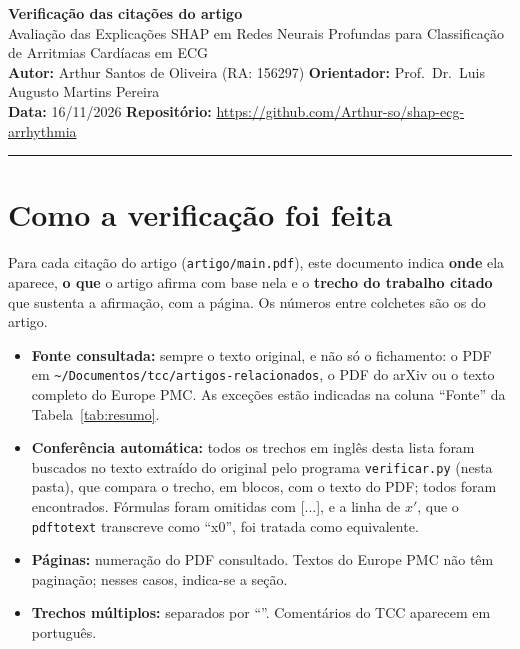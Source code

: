 \documentclass[11pt,a4paper]{article}
\begin{document}
\begin{center}
    {\LARGE \textbf{Verificação das citações do artigo}} \\[0.35em]
    {\large Avaliação das Explicações SHAP em Redes Neurais Profundas para Classificação de Arritmias Cardíacas em ECG} \\[0.3em]
    \textbf{Autor:} Arthur Santos de Oliveira (RA: 156297) \quad \textbf{Orientador:} Prof.\ Dr.\ Luis Augusto Martins Pereira \\[0.2em]
    \textbf{Data:} 16/11/2026 \quad \textbf{Repositório:} \url{https://github.com/Arthur-so/shap-ecg-arrhythmia}
\end{center}
\vspace{-0.5em}
\hrule
\vspace{0.8em}

\section{Como a verificação foi feita}
Para cada citação do artigo (\texttt{artigo/main.pdf}), este documento indica \textbf{onde} ela aparece, \textbf{o que} o artigo afirma com base nela e o \textbf{trecho do trabalho citado} que sustenta a afirmação, com a página. Os números entre colchetes são os do artigo.

\begin{itemize}
\item \textbf{Fonte consultada:} sempre o texto original, e não só o fichamento: o PDF em \texttt{\textasciitilde/Documentos/tcc/artigos-relacionados}, o PDF do arXiv ou o texto completo do Europe PMC. As exceções estão indicadas na coluna ``Fonte'' da Tabela~\ref{tab:resumo}.
\item \textbf{Conferência automática:} todos os trechos em inglês desta lista foram buscados no texto extraído do original pelo programa \texttt{verificar.py} (nesta pasta), que compara o trecho, em blocos, com o texto do PDF; todos foram encontrados. Fórmulas foram omitidas com [...], e a linha de $x'$, que o \texttt{pdftotext} transcreve como ``x0'', foi tratada como equivalente.
\item \textbf{Páginas:} numeração do PDF consultado. Textos do Europe PMC não têm paginação; nesses casos, indica-se a seção.
\item \textbf{Trechos múltiplos:} separados por ``\textbar\textbar''. Comentários do TCC aparecem em português.
\end{itemize}
\end{document}
